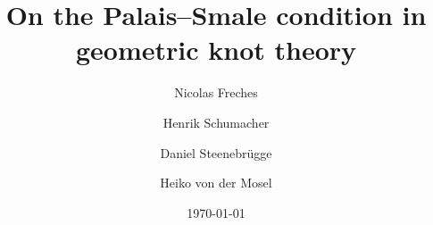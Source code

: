\title{On the Palais--Smale condition in geometric knot theory}

\author{Nicolas Freches}
\author{Henrik Schumacher}
\author{Daniel Steenebr\"ugge}
\author{Heiko von der Mosel}

\date{\today}